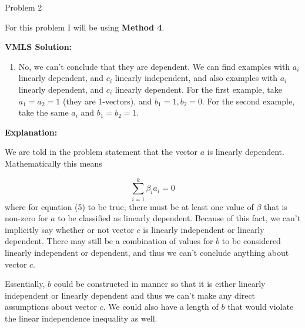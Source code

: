\begin{problem}{Problem 2}
    \begin{Highlight}
        For this problem I will be using \textbf{Method 4}. \vspace*{1em}

        \textbf{VMLS Solution:}

        \begin{enumerate}[label = (\alph*), start = 2]
            \item No, we can’t conclude that they are dependent. We can find examples with $a_{i}$ linearly dependent, and $c_{i}$ linearly independent, and also examples with $a_{i}$ linearly 
            dependent, and $c_{i}$ linearly dependent. For the first example, take $a_{1} = a_{2} = 1$ (they are 1-vectors), and $b_{1} = 1 , b_{2} = 0$. For the second example, take the same $a_{i}$ 
            and $b_{1} = b_{2} = 1$.
        \end{enumerate}

        \textbf{Explanation:} \vspace*{1em}

        We are told in the problem statement that the vector $a$ is linearly dependent. Mathematically this means

        \begin{equation}
            \sum_{i = 1}^{k} \beta_{i}a_{i} = 0
        \end{equation}
        where for equation (5) to be true, there must be at least one value of $\beta$ that is non-zero for $a$ to be classified as linearly dependent. Because of this fact, we can't implicitly say
        whether or not vector $c$ is linearly independent or linearly dependent. There may still be a combination of values for $b$ to be considered linearly independent or dependent, and thus we can't
        conclude anything about vector $c$.

        Essentially, $b$ could be constructed in manner so that it is either linearly independent or linearly dependent and thus we can't make any direct assumptions about vector $c$. We could also have
        a length of $b$ that would violate the linear independence inequality as well.
    \end{Highlight}
\end{problem}

